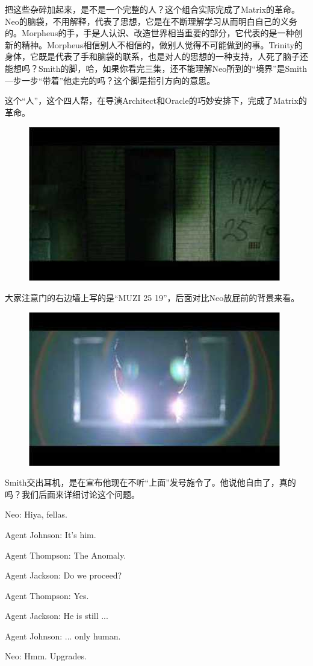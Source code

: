 \documentclass[UTF8]{ctexart}
\newenvironment{myquote}{\color{green} \setlength{\leftskip}{6em} \setlength{\rightskip}{4em} \setlength{\parindent}{-2em}}{\par}
\begin{document}
把这些杂碎加起来，是不是一个完整的人？这个组合实际完成了Matrix的革命。Neo的脑袋，不用解释，代表了思想，它是在不断理解学习从而明白自己的义务的。Morpheus的手，手是人认识、改造世界相当重要的部分，它代表的是一种创新的精神。Morpheus相信别人不相信的，做别人觉得不可能做到的事。Trinity的身体，它既是代表了手和脑袋的联系，也是对人的思想的一种支持，人死了脑子还能想吗？Smith的脚，哈，如果你看完三集，还不能理解Neo所到的“境界”是Smith—步一步“带着”他走完的吗？这个脚是指引方向的意思。

这个“人”，这个四人帮，在导演Architect和Oracle的巧妙安排下，完成了Matrix的革命。

\begin{figure}[htb]
\centering
\includegraphics[width=0.5\linewidth]{fig/read_reloaded-20}
\end{figure}

大家注意门的右边墙上写的是“MUZI 25 19”，后面对比Neo放屁前的背景来看。

\begin{figure}[htb]
\centering
\includegraphics[width=0.5\linewidth]{fig/read_reloaded-21}
\end{figure}

Smith交出耳机，是在宣布他现在不听“上面”发号施令了。他说他自由了，真的吗？我们后面来详细讨论这个问题。

\begin{myquote}
Neo: Hiya, fellas.

Agent Johnson: It's him.

Agent Thompson: The Anomaly.

Agent Jackson: Do we proceed?

Agent Thompson: Yes.

Agent Jackson: He is still ...

Agent Johnson: ... only human.

Neo: Hmm. Upgrades.
\end{myquote}
\end{document}
